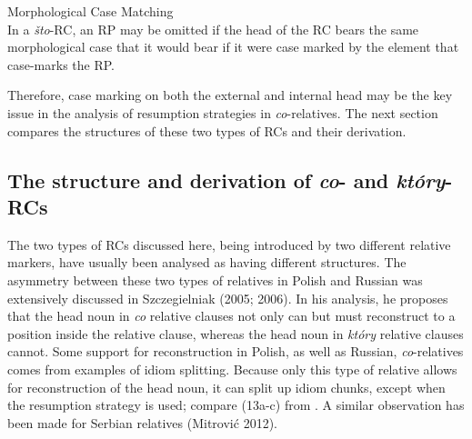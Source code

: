 \documentclass[output=paper]{langsci/langscibook}
\begin{document}
\ea%
    \label{ex:leska:12}
Morphological Case Matching\\
In a \textit{što}{}-RC, an RP may be omitted if the head of the RC bears the same morphological case that it would bear if it were case marked by the element that case-marks the RP.
    \z

Therefore, case marking on both the external and internal head may be the key issue in the analysis of resumption strategies in \textit{co}{}-relatives. The next section compares the structures of these two types of RCs and their derivation.

\subsection{The structure and derivation of \textit{co}{}- and \textit{który}{}-RCs}%
The two types of RCs discussed here, being introduced by two different relative markers, have usually been analysed as having different structures. The asymmetry between these two types of relatives in Polish and Russian was extensively discussed in Szczegielniak (2005; 2006). In his analysis, he proposes that the head noun in \textit{co} relative clauses not only can but must reconstruct to a position inside the relative clause, whereas the head noun in \textit{który} relative clauses cannot. Some support for reconstruction in Polish, as well as Russian, \textit{co}{}-relatives comes from examples of idiom splitting. Because only this type of relative allows for reconstruction of the head noun, it can split up idiom chunks, except when the resumption strategy is used; compare (13a-c) from \citet[377]{Szczegielniak2006}. A similar observation has been made for Serbian relatives (Mitrović 2012).

\ea%
    \label{ex:leska:13}
    \z
\z    
    
\end{document}
